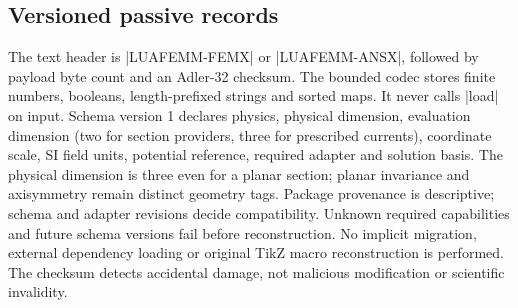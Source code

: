 \subsection{Versioned passive records}
The text header is |LUAFEMM-FEMX| or |LUAFEMM-ANSX|, followed by payload byte count
and an Adler-32 checksum. The bounded codec stores finite numbers, booleans,
length-prefixed strings and sorted maps. It never calls |load| on input.
Schema version 1 declares physics, physical dimension, evaluation dimension (two for section providers, three for prescribed currents),
coordinate scale, SI field units, potential reference, required adapter and
solution basis. The physical dimension is three even for a planar section;
planar invariance and axisymmetry remain distinct geometry tags.
Package provenance is descriptive; schema and adapter revisions decide
compatibility. Unknown required capabilities and future schema versions fail
before reconstruction. No implicit migration, external dependency loading or
original TikZ macro reconstruction is performed. The checksum detects accidental
damage, not malicious modification or scientific invalidity.
